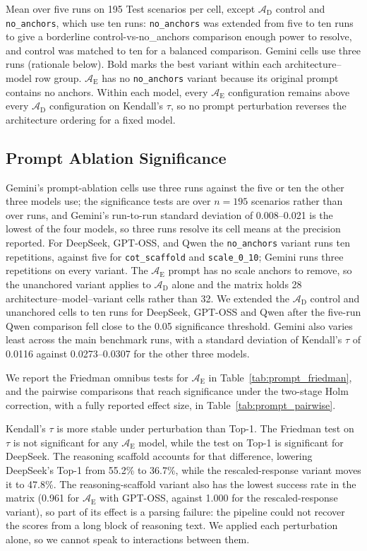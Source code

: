 \documentclass[11pt]{article}
\begin{document}
Mean over five runs on 195 Test scenarios per cell, except $\mathcal{A}_{\text{D}}$ control and \texttt{no\_anchors}, which use ten runs: \texttt{no\_anchors} was extended from five to ten runs to give a borderline control-vs-no\_anchors comparison enough power to resolve, and control was matched to ten for a balanced comparison. Gemini cells use three runs (rationale below). Bold marks the best variant within each architecture--model row group. $\mathcal{A}_{\text{E}}$ has no \texttt{no\_anchors} variant because its original prompt contains no anchors. Within each model, every $\mathcal{A}_{\text{E}}$ configuration remains above every $\mathcal{A}_{\text{D}}$ configuration on Kendall's $\tau$, so no prompt perturbation reverses the architecture ordering for a fixed model.

\subsection{Prompt Ablation Significance}
\label{app:prompt-ablation-significance}

Gemini's prompt-ablation cells use three runs against the five or ten the other three models use; the significance tests are over $n=195$ scenarios rather than over runs, and Gemini's run-to-run standard deviation of 0.008--0.021 is the lowest of the four models, so three runs resolve its cell means at the precision reported. For DeepSeek, GPT-OSS, and Qwen the \texttt{no\_anchors} variant runs ten repetitions, against five for \texttt{cot\_scaffold} and \texttt{scale\_0\_10}; Gemini runs three repetitions on every variant. The $\mathcal{A}_{\text{E}}$ prompt has no scale anchors to remove, so the unanchored variant applies to $\mathcal{A}_{\text{D}}$ alone and the matrix holds 28 architecture--model--variant cells rather than 32. We extended the $\mathcal{A}_{\text{D}}$ control and unanchored cells to ten runs for DeepSeek, GPT-OSS and Qwen after the five-run Qwen comparison fell close to the 0.05 significance threshold. Gemini also varies least across the main benchmark runs, with a standard deviation of Kendall's $\tau$ of 0.0116 against 0.0273--0.0307 for the other three models.

We report the Friedman omnibus tests for $\mathcal{A}_{\text{E}}$ in Table~\ref{tab:prompt_friedman}, and the pairwise comparisons that reach significance under the two-stage Holm correction, with a fully reported effect size, in Table~\ref{tab:prompt_pairwise}.

Kendall's $\tau$ is more stable under perturbation than Top-1. The Friedman test on $\tau$ is not significant for any $\mathcal{A}_{\text{E}}$ model, while the test on Top-1 is significant for DeepSeek. The reasoning scaffold accounts for that difference, lowering DeepSeek's Top-1 from 55.2\% to 36.7\%, while the rescaled-response variant moves it to 47.8\%. The reasoning-scaffold variant also has the lowest success rate in the matrix (0.961 for $\mathcal{A}_{\text{E}}$ with GPT-OSS, against 1.000 for the rescaled-response variant), so part of its effect is a parsing failure: the pipeline could not recover the scores from a long block of reasoning text. We applied each perturbation alone, so we cannot speak to interactions between them.
\end{document}
